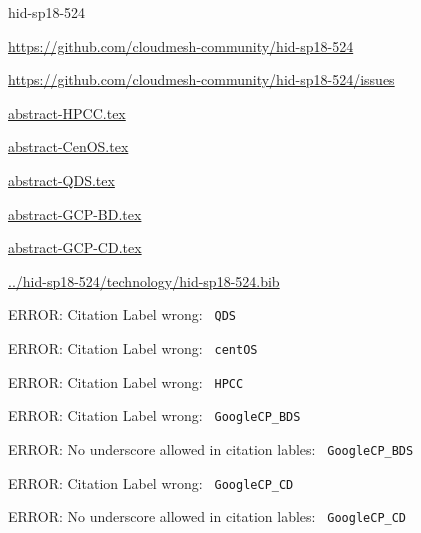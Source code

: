 \begin{IU}

hid-sp18-524

\url{https://github.com/cloudmesh-community/hid-sp18-524}

\url{https://github.com/cloudmesh-community/hid-sp18-524/issues}

\href{https://github.com/cloudmesh-community/hid-sp18-524/blob/master//technology/abstract-HPCC.tex}{abstract-HPCC.tex}

\href{https://github.com/cloudmesh-community/hid-sp18-524/blob/master//technology/abstract-CenOS.tex}{abstract-CenOS.tex}

\href{https://github.com/cloudmesh-community/hid-sp18-524/blob/master//technology/abstract-QDS.tex}{abstract-QDS.tex}

\href{https://github.com/cloudmesh-community/hid-sp18-524/blob/master//technology/abstract-GCP-BD.tex}{abstract-GCP-BD.tex}

\href{https://github.com/cloudmesh-community/hid-sp18-524/blob/master//technology/abstract-GCP-CD.tex}{abstract-GCP-CD.tex}

\href{https://github.com/cloudmesh-community/hid-sp18-524/blob/master//technology/hid-sp18-524.bib}{../hid-sp18-524/technology/hid-sp18-524.bib}

 ERROR: Citation Label wrong: \verb| QDS |

 ERROR: Citation Label wrong: \verb| centOS |

 ERROR: Citation Label wrong: \verb| HPCC |

 ERROR: Citation Label wrong: \verb| GoogleCP_BDS |

 ERROR: No underscore allowed in citation lables: \verb| GoogleCP_BDS |

 ERROR: Citation Label wrong: \verb| GoogleCP_CD |

 ERROR: No underscore allowed in citation lables: \verb| GoogleCP_CD |

\end{IU}


